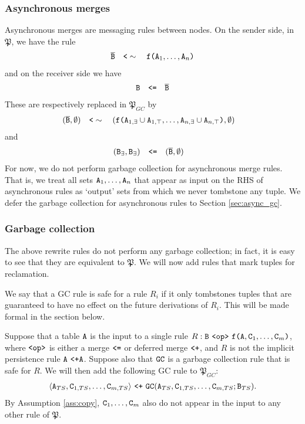 \subsubsection{Asynchronous merges}
Asynchronous merges are messaging rules between nodes.
On the sender side, in $\mathfrak{P}$, we have the rule 
\begin{align}
\overline{\tt{B}} \quad\tt{<}\sim\quad \tt{f(}\tt{A}_1,\dots,\tt{A}_n\tt{)}
\end{align}
and on the receiver side we have
\begin{align}
\tt{B} \quad\tt{<=}\quad \overline{\tt{B}}
\end{align}
These are respectively replaced in $\mathfrak{P}_{GC}$ by
\begin{align}
(\overline{\tt{B}}, \emptyset) &\quad\tt{<}\sim\quad (\tt{f(}\tt{A}_{1,\exists} \cup \tt{A}_{1,\top},\dots,\tt{A}_{n,\exists} \cup \tt{A}_{n,\top}\tt{)}, \emptyset)
\end{align}
and
\begin{align}
(\tt{B}_\exists, \tt{B}_\exists) &\quad\tt{<=}\quad (\overline{\tt{B}}, \emptyset)
\end{align}
For now, we do not perform garbage collection for asynchronous merge rules.
That is, we treat all sets $\tt{A}_1, \dots, \tt{A}_n$ that appear as input on the RHS of asynchronous rules as `output' sets from which we never tombstone any tuple.
We defer the garbage collection for asynchronous rules to Section \ref{sec:async_gc}.

\subsubsection{Garbage collection}
The above rewrite rules do not perform any garbage collection; in fact, it is easy to see that they are equivalent to $\mathfrak{P}$.
We will now add rules that mark tuples for reclamation.

We say that a GC rule is safe for a rule $R_i$ if it only tombstones tuples that are guaranteed to have no effect on the future derivations of $R_i$.
This will be made formal in the section below.

Suppose that a table $\tt{A}$ is the input to a single rule $R: \tt{B} ~\tt{<op>}~ \tt{f}\tt{(}\tt{A},\tt{C}_1,\dots,\tt{C}_m\tt{)}$, where $\tt{<op>}$ is either a merge $\tt{<=}$ or deferred merge $\tt{<+}$, and $R$ is not the implicit persistence rule $\tt{A} ~\tt{<+} \tt{A}$.
Suppose also that $\tt{GC}$ is a garbage collection rule that is safe for $R$.
We will then add the following GC rule to $\mathfrak{P}_{GC}$:
\begin{align}
\langle \tt{A}_{TS}, \tt{C}_{1,TS}, \dots, \tt{C}_{m,TS} \rangle
~\tt{<+}~
\tt{GC}(\tt{A}_{TS}, \tt{C}_{1,TS}, \dots, \tt{C}_{m,TS}; \tt{B}_{TS}).
\end{align}
By Assumption \ref{ass:copy}, $\tt{C}_1,\dots,\tt{C}_m$ also do not appear in the input to any other rule of $\mathfrak{P}$.

